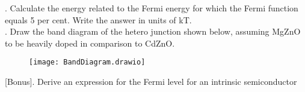 \documentclass[12pt]{article}\date{}
\begin{document}
. Calculate the energy related to the Fermi energy for which the Fermi function equals 5 per cent. Write the answer in units of kT. \\ [15pt]

. Draw the band diagram of the hetero junction shown below, assuming MgZnO to be heavily doped in comparison to CdZnO. \\ [15pt]

\begin{figure}[!ht]
  \centering
  \texttt{[image: BandDiagram.drawio]}
\end{figure}

 [Bonus]. Derive an expression for the Fermi level for an intrinsic semiconductor \\ [15pt]
\end{document}

